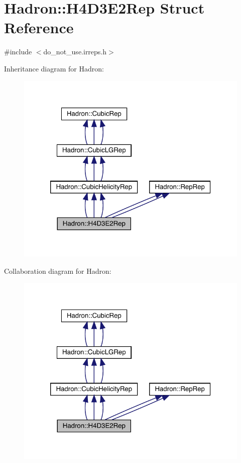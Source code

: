 \hypertarget{structHadron_1_1H4D3E2Rep}{}\section{Hadron\+:\+:H4\+D3\+E2\+Rep Struct Reference}
\label{structHadron_1_1H4D3E2Rep}


{\ttfamily \#include $<$do\+\_\+not\+\_\+use.\+irreps.\+h$>$}



Inheritance diagram for Hadron\+:
\nopagebreak
\begin{figure}[H]
\begin{center}
\leavevmode
\includegraphics[width=320pt]{db/dd2/structHadron_1_1H4D3E2Rep__inherit__graph}
\end{center}
\end{figure}


Collaboration diagram for Hadron\+:
\nopagebreak
\begin{figure}[H]
\begin{center}
\leavevmode
\includegraphics[width=320pt]{d2/d24/structHadron_1_1H4D3E2Rep__coll__graph}
\end{center}
\end{figure}
